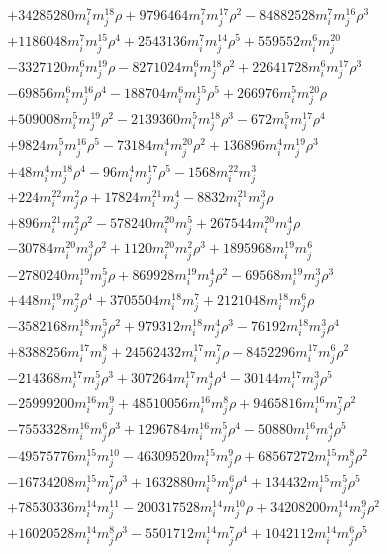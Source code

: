 {\begin{align*}
&+34285280m_i^{7}m_j^{18}\rho+9796464m_i^{7}m_j^{17}\rho^{2}-84882528m_i^{7}m_j^{16}\rho^{3}\\
&+1186048m_i^{7}m_j^{15}\rho^{4}+2543136m_i^{7}m_j^{14}\rho^{5}+559552m_i^{6}m_j^{20}\\
&-3327120m_i^{6}m_j^{19}\rho-8271024m_i^{6}m_j^{18}\rho^{2}+22641728m_i^{6}m_j^{17}\rho^{3}\\
&-69856m_i^{6}m_j^{16}\rho^{4}-188704m_i^{6}m_j^{15}\rho^{5}+266976m_i^{5}m_j^{20}\rho\\
&+509008m_i^{5}m_j^{19}\rho^{2}-2139360m_i^{5}m_j^{18}\rho^{3}-672m_i^{5}m_j^{17}\rho^{4}\\
&+9824m_i^{5}m_j^{16}\rho^{5}-73184m_i^{4}m_j^{20}\rho^{2}+136896m_i^{4}m_j^{19}\rho^{3}\\
&+48m_i^{4}m_j^{18}\rho^{4}-96m_i^{4}m_j^{17}\rho^{5}-1568m_i^{22}m_j^{3}\\
&+224m_i^{22}m_j^{2}\rho+17824m_i^{21}m_j^{4}-8832m_i^{21}m_j^{3}\rho\\
&+896m_i^{21}m_j^{2}\rho^{2}-578240m_i^{20}m_j^{5}+267544m_i^{20}m_j^{4}\rho\\
&-30784m_i^{20}m_j^{3}\rho^{2}+1120m_i^{20}m_j^{2}\rho^{3}+1895968m_i^{19}m_j^{6}\\
&-2780240m_i^{19}m_j^{5}\rho+869928m_i^{19}m_j^{4}\rho^{2}-69568m_i^{19}m_j^{3}\rho^{3}\\
&+448m_i^{19}m_j^{2}\rho^{4}+3705504m_i^{18}m_j^{7}+2121048m_i^{18}m_j^{6}\rho\\
&-3582168m_i^{18}m_j^{5}\rho^{2}+979312m_i^{18}m_j^{4}\rho^{3}-76192m_i^{18}m_j^{3}\rho^{4}\\
&+8388256m_i^{17}m_j^{8}+24562432m_i^{17}m_j^{7}\rho-8452296m_i^{17}m_j^{6}\rho^{2}\\
&-214368m_i^{17}m_j^{5}\rho^{3}+307264m_i^{17}m_j^{4}\rho^{4}-30144m_i^{17}m_j^{3}\rho^{5}\\
&-25999200m_i^{16}m_j^{9}+48510056m_i^{16}m_j^{8}\rho+9465816m_i^{16}m_j^{7}\rho^{2}\\
&-7553328m_i^{16}m_j^{6}\rho^{3}+1296784m_i^{16}m_j^{5}\rho^{4}-50880m_i^{16}m_j^{4}\rho^{5}\\
&-49575776m_i^{15}m_j^{10}-46309520m_i^{15}m_j^{9}\rho+68567272m_i^{15}m_j^{8}\rho^{2}\\
&-16734208m_i^{15}m_j^{7}\rho^{3}+1632880m_i^{15}m_j^{6}\rho^{4}+134432m_i^{15}m_j^{5}\rho^{5}\\
&+78530336m_i^{14}m_j^{11}-200317528m_i^{14}m_j^{10}\rho+34208200m_i^{14}m_j^{9}\rho^{2}\\
&+16020528m_i^{14}m_j^{8}\rho^{3}-5501712m_i^{14}m_j^{7}\rho^{4}+1042112m_i^{14}m_j^{6}\rho^{5}\\

\end{align*}}

